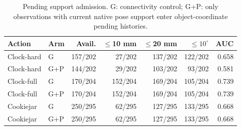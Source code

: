 \begin{table}[t]\centering\scriptsize
\caption{Pending support admission. G: connectivity control; G+P: only observations with current native pose support enter object-coordinate pending histories.}
\label{tab:pending-pose-support}
\begin{tabular}{llrrrrr}\toprule
Action & Arm & Avail. & $\leq$10 mm & $\leq$20 mm & $\leq10^\circ$ & AUC\\\midrule
Clock-hard & G & 157/202 & 27/202 & 137/202 & 122/202 & 0.658\\
Clock-hard & G+P & 144/202 & 29/202 & 103/202 & 93/202 & 0.581\\
Clock-full & G & 170/204 & 152/204 & 169/204 & 105/204 & 0.739\\
Clock-full & G+P & 170/204 & 152/204 & 169/204 & 105/204 & 0.739\\
Cookiejar & G & 250/295 & 62/295 & 127/295 & 133/295 & 0.668\\
Cookiejar & G+P & 250/295 & 62/295 & 127/295 & 133/295 & 0.668\\
\bottomrule\end{tabular}\end{table}
